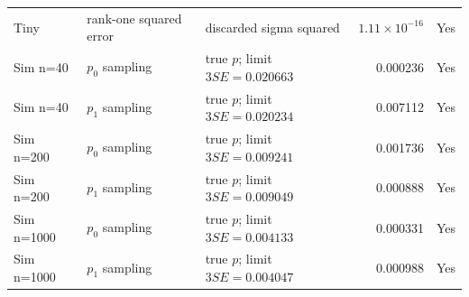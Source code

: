 {\begin{longtable}{p{}p{}p{}rl}
Tiny & rank-one squared error & discarded sigma squared & $1.11\times10^{-16}$ & Yes \\
Sim n=40 & $p_{0}$ sampling & true $p$; limit $3SE=0.020663$ & 0.000236 & Yes \\
Sim n=40 & $p_{1}$ sampling & true $p$; limit $3SE=0.020234$ & 0.007112 & Yes \\
Sim n=200 & $p_{0}$ sampling & true $p$; limit $3SE=0.009241$ & 0.001736 & Yes \\
Sim n=200 & $p_{1}$ sampling & true $p$; limit $3SE=0.009049$ & 0.000888 & Yes \\
Sim n=1000 & $p_{0}$ sampling & true $p$; limit $3SE=0.004133$ & 0.000331 & Yes \\
Sim n=1000 & $p_{1}$ sampling & true $p$; limit $3SE=0.004047$ & 0.000988 & Yes \\
\bottomrule
\end{longtable}
}
